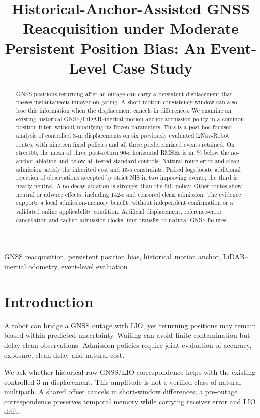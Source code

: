 \documentclass[conference]{IEEEtran}
\title{Historical-Anchor-Assisted GNSS Reacquisition under Moderate Persistent Position Bias: An Event-Level Case Study}
\author{\IEEEauthorblockN{Tutor-review manuscript}\IEEEauthorblockA{Author metadata awaiting human confirmation}}
\begin{document}
\maketitle
\begin{abstract}
GNSS positions returning after an outage can carry a persistent displacement that passes instantaneous innovation gating. A short motion-consistency window can also lose this information when the displacement cancels in differences. We examine an existing historical GNSS/LiDAR--inertial motion-anchor admission policy in a common position filter, without modifying its frozen parameters. This is a post-hoc focused analysis of controlled 3-m displacements on six previously evaluated i2Nav-Robot routes, with nineteen fixed policies and all three predetermined events retained. On street00, the mean of three post-return 90-s horizontal RMSEs is  m, \% below the no-anchor ablation and below all tested standard controls. Natural-route error and clean admission satisfy the inherited cost and 15-s constraints. Paired logs locate additional rejection of observations accepted by strict NIS in two improving events; the third is nearly neutral. A no-decay ablation is stronger than the full policy. Other routes show neutral or adverse effects, including 142-s and censored clean admission. The evidence supports a local admission-memory benefit, without independent confirmation or a validated online applicability condition. Artificial displacement, reference-error cancellation and cached admission clocks limit transfer to natural GNSS failures.
\end{abstract}
\begin{IEEEkeywords}GNSS reacquisition, persistent position bias, historical motion anchor, LiDAR--inertial odometry, event-level evaluation\end{IEEEkeywords}

\section{Introduction}
A robot can bridge a GNSS outage with LIO, yet returning positions may remain biased within predicted uncertainty. Waiting can avoid finite contamination but delay clean observations. Admission policies require joint evaluation of accuracy, exposure, clean delay and natural cost.

We ask whether historical raw GNSS/LIO correspondence helps with the existing controlled 3-m displacement. This amplitude is not a verified class of natural multipath. A shared offset cancels in short-window differences; a pre-outage correspondence preserves temporal memory while carrying receiver error and LIO drift.
\end{document}
